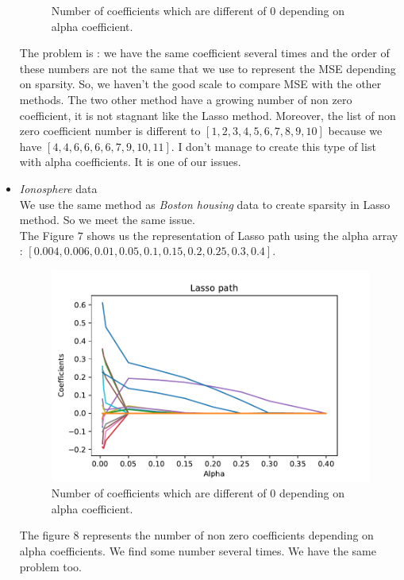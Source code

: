 \documentclass{article}
\begin{document}
\begin{itemize}
\begin{figure}[!ht]
    \caption{Number of coefficients which are different of $0$ depending on alpha coefficient.}
\end{figure}
The problem is : we have the same coefficient several times and the order of these numbers are not the same that we use to represent the MSE depending on sparsity. So, we haven't the good scale to compare MSE with the other methods. The two other method have a growing number of non zero coefficient, it is not stagnant like the Lasso method. Moreover, the list of non zero coefficient number is different to $[1, 2, 3, 4, 5, 6, 7, 8, 9 ,10]$ because we have $[4, 4, 6, 6, 6, 6, 7, 9, 10, 11]$. I don't manage to create this type of list with alpha coefficients. It is one of our issues.
\\
   \item \textit{Ionosphere} data\\
We use the same method as \textit{Boston housing} data to create sparsity in Lasso method. So we meet the same issue.\\
The Figure $7$ shows us the representation of Lasso path using the alpha array : $[0.004,0.006,0.01,0.05,0.1,0.15, 0.2, 0.25, 0.3, 0.4]$.\\
   \begin{figure}[!ht]
    \centering
    \includegraphics[scale=0.6]{./images/alpha_choice_lasso.pdf}
    \caption{Number of coefficients which are different of $0$ depending on alpha coefficient.}
\end{figure}
The figure $8$ represents the number of non zero coefficients depending on alpha coefficients. We find some number several times. We have the same problem too.
\begin{figure}[!ht]
    \centering

\end{figure}
\end{itemize}
\end{document}

